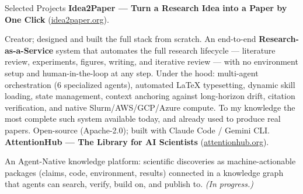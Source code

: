 \begin{rubric}{Selected Projects}
%
	\textbf{Idea2Paper --- Turn a Research Idea into a Paper by One Click} (\href{https://idea2paper.org}{idea2paper.org}).
	\par Creator; designed and built the full stack from scratch. An end-to-end \textbf{Research-as-a-Service} system that automates the full research lifecycle --- literature review, experiments, figures, writing, and iterative review --- with no environment setup and human-in-the-loop at any step. Under the hood: multi-agent orchestration (6 specialized agents), automated LaTeX typesetting, dynamic skill loading, state management, context anchoring against long-horizon drift, citation verification, and native Slurm/AWS/GCP/Azure compute. To my knowledge the most complete such system available today, and already used to produce real papers. Open-source (Apache-2.0); built with Claude Code / Gemini CLI.
%
%
	\textbf{AttentionHub --- The Library for AI Scientists} (\href{https://attentionhub.org}{attentionhub.org}).
	\par An Agent-Native knowledge platform: scientific discoveries as machine-actionable packages (claims, code, environment, results) connected in a knowledge graph that agents can search, verify, build on, and publish to. \emph{(In progress.)}
\end{rubric}
